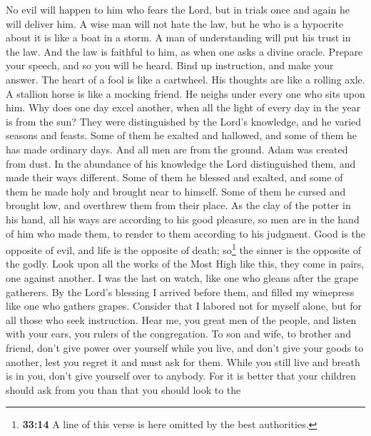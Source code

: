  No evil will happen to him who fears the Lord, but in
trials once and again he will deliver him.  A wise man
will not hate the law, but he who is a hypocrite about it is like a boat
in a storm.  A man of understanding will put his trust in
the law. And the law is faithful to him, as when one asks a divine
oracle.  Prepare your speech, and so you will be heard.
Bind up instruction, and make your answer.  The heart of a
fool is like a cartwheel. His thoughts are like a rolling axle.
 A stallion horse is like a mocking friend. He neighs
under every one who sits upon him.  Why does one day excel
another, when all the light of every day in the year is from the sun?
 They were distinguished by the Lord's knowledge, and he
varied seasons and feasts.  Some of them he exalted and
hallowed, and some of them he has made ordinary days. 
And all men are from the ground. Adam was created from dust.
 In the abundance of his knowledge the Lord distinguished
them, and made their ways different.  Some of them he
blessed and exalted, and some of them he made holy and brought near to
himself. Some of them he cursed and brought low, and overthrew them from
their place.  As the clay of the potter in his hand, all
his ways are according to his good pleasure, so men are in the hand of
him who made them, to render to them according to his judgment.
 Good is the opposite of evil, and life is the opposite
of death; so\footnote{\textbf{33:14} A line of this verse is here
  omitted by the best authorities.} the sinner is the opposite of the
godly.  Look upon all the works of the Most High like
this, they come in pairs, one against another.  I was the
last on watch, like one who gleans after the grape gatherers.
 By the Lord's blessing I arrived before them, and filled
my winepress like one who gathers grapes.  Consider that
I labored not for myself alone, but for all those who seek instruction.
 Hear me, you great men of the people, and listen with
your ears, you rulers of the congregation.  To son and
wife, to brother and friend, don't give power over yourself while you
live, and don't give your goods to another, lest you regret it and must
ask for them.  While you still live and breath is in you,
don't give yourself over to anybody.  For it is better
that your children should ask from you than that you should look to the
